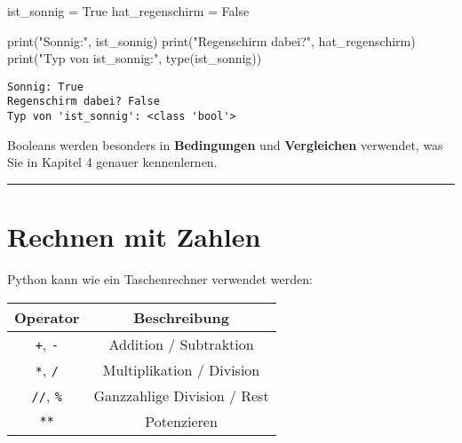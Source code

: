 \documentclass[
  letterpaper,
  DIV=11,
  numbers=noendperiod]{scrreprt}
\newenvironment{Shaded}{\begin{snugshade}}{\end{snugshade}}
\newcommand{\BuiltInTok}[1]{\textcolor[rgb]{0.00,0.23,0.31}{#1}}
\newcommand{\NormalTok}[1]{\textcolor[rgb]{0.00,0.23,0.31}{#1}}
\newcommand{\OperatorTok}[1]{\textcolor[rgb]{0.37,0.37,0.37}{#1}}
\newcommand{\StringTok}[1]{\textcolor[rgb]{0.13,0.47,0.30}{#1}}
\newcommand{\VariableTok}[1]{\textcolor[rgb]{0.07,0.07,0.07}{#1}}
\begin{document}
\begin{Shaded}
\begin{Highlighting}[]
\NormalTok{ist\_sonnig }\OperatorTok{=} \VariableTok{True}
\NormalTok{hat\_regenschirm }\OperatorTok{=} \VariableTok{False}

\BuiltInTok{print}\NormalTok{(}\StringTok{"Sonnig:"}\NormalTok{, ist\_sonnig)}
\BuiltInTok{print}\NormalTok{(}\StringTok{"Regenschirm dabei?"}\NormalTok{, hat\_regenschirm)}
\BuiltInTok{print}\NormalTok{(}\StringTok{"Typ von \textquotesingle{}ist\_sonnig\textquotesingle{}:"}\NormalTok{, }\BuiltInTok{type}\NormalTok{(ist\_sonnig))}
\end{Highlighting}
\end{Shaded}

\begin{verbatim}
Sonnig: True
Regenschirm dabei? False
Typ von 'ist_sonnig': <class 'bool'>
\end{verbatim}

Booleans werden besonders in \textbf{Bedingungen} und
\textbf{Vergleichen} verwendet, was Sie in Kapitel 4 genauer
kennenlernen.

\begin{center}\rule{0.5\linewidth}{0.5pt}\end{center}

\section{Rechnen mit Zahlen}\label{rechnen-mit-zahlen}

Python kann wie ein Taschenrechner verwendet werden:

\begin{longtable}[]{@{}cc@{}}
\toprule\noalign{}
Operator & Beschreibung \\
\midrule\noalign{}
\endhead
\bottomrule\noalign{}
\endlastfoot
\texttt{+}, \texttt{-} & Addition / Subtraktion \\
\texttt{*}, \texttt{/} & Multiplikation / Division \\
\texttt{//}, \texttt{\%} & Ganzzahlige Division / Rest \\
\texttt{**} & Potenzieren \\
\end{longtable}
\end{document}
